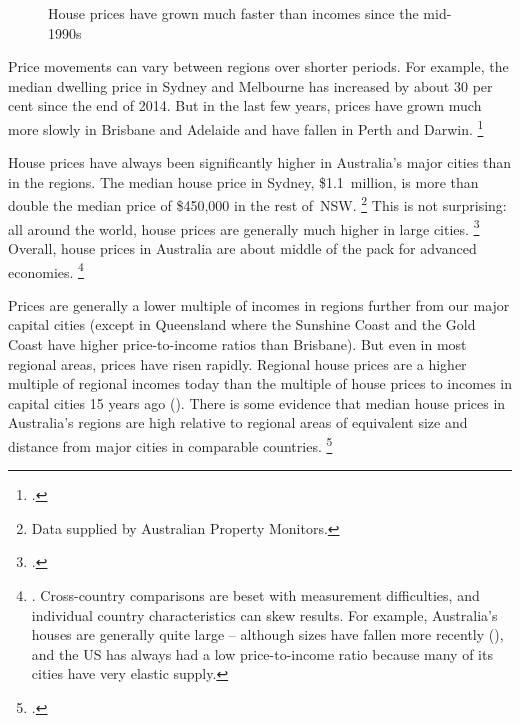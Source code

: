 \begin{figure}
\caption{House prices have grown much faster than incomes since the mid-1990s}\label{fig:long-run-house-prices-income}
%
{\textcites{Yates}{ABS-2017-Residential}{ABS-Avg-weekly-earnings-May2017}}
\end{figure}

Price movements can vary between regions over shorter periods. For example, the median dwelling price in Sydney and Melbourne has increased by about 30 per cent since the end of 2014.
But in the last few years, prices have grown much more slowly in Brisbane and Adelaide and have fallen in Perth and Darwin.%
    \footcite[][Table~1]{ABS-2017-Residential}

House prices have always been significantly higher in Australia's major cities than in the regions.
The median house price in Sydney, \$1.1~million, is more than double the median price of \$450,000 in the rest of~NSW\@.%
	\footnote{Data supplied by Australian Property Monitors.}
This is not surprising: all around the world, house prices are generally much higher in large cities.%
\footcite{Eslake-why-housing-expensive} Overall, house prices in Australia are about middle of the pack for advanced economies.%
	\footnote{\textcite{Ellis-2017-Speech-Aust-Housing-Researchers}.
	Cross-country comparisons are beset with measurement difficulties, and individual country characteristics can skew results.
    For example, Australia's houses are generally quite large -- although sizes have fallen more recently (\textcite{Van-onselen-2017-property-rent-seeker}), and the US has always had a low price-to-income ratio because many of its cities have very elastic supply.}

Prices are generally a lower multiple of incomes in regions further from our major capital cities (except in Queensland where the Sunshine Coast and the Gold Coast have higher price-to-income ratios than Brisbane).
But even in most regional areas, prices have risen rapidly.
Regional house prices are a higher multiple of regional incomes today than the multiple of house prices to incomes in capital cities 15 years ago ().
There is some evidence that median house prices in Australia's regions are high relative to regional areas of equivalent size and distance from major cities in comparable countries.%
\footcites{Business-2016-housingaffordabilitybunkum}{Demographia-2017-13Annual}

